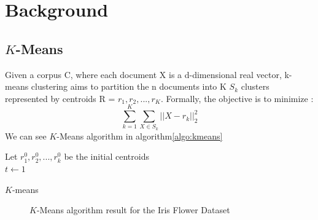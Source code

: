 \section{Background}\label{sec:related}
\subsection{$K$-Means}
Given a corpus C, where each document X is a 
d-dimensional real vector, k-means clustering aims to partition the n 
documents into K $S_k$ clusters represented by centroids 
R = {$r_1, r_2, ..., r_K$}.
Formally, the objective is to minimize :
$$
\sum\limits_{k =1 }^K \sum\limits_{X \in S_k} ||X - r_k||_2^2
$$
We can see $K$-Means algorithm in algorithm\ref{algo:kmeans}
\begin{algorithm}
  Let $r_1^{0}, r_2^{0} , ..., r_k^{0}$ be the initial centroids\\
  $t \gets 1$\\
  \caption{\label{algo:kmeans}$K$-means}
\end{algorithm}
\begin{figure}
  \centering
  \caption{$K$-Means algorithm result for the Iris Flower Dataset \cite{citeulike:8631377}}
  \label{fig:example_km}
\end{figure}
